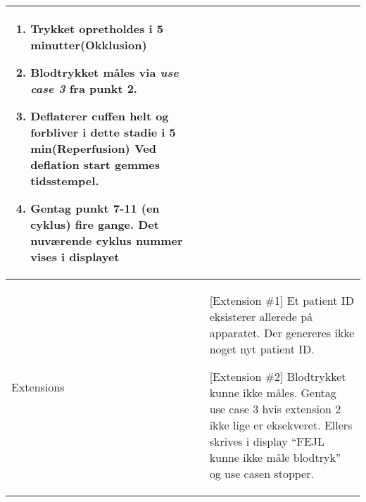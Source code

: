 \begin{center}
\begin{tabular}{ | m{4cm} | m{8cm}| }
\begin{enumerate}
				\item Trykket opretholdes i 5 minutter(Okklusion)
				\item Blodtrykket måles via \textit{use case 3}
				fra punkt 2.
				\item Deflaterer cuffen helt og forbliver i dette stadie i 5 min(Reperfusion) Ved deflation start gemmes tidsstempel.
				\item Gentag punkt 7-11 (en cyklus) fire gange. Det nuværende cyklus nummer vises i displayet
			\end{enumerate} \\ 
			\hline
			Extensions & [Extension \#1] Et patient ID eksisterer allerede på apparatet. Der genereres ikke noget nyt patient ID.
			
			[Extension \#2] Blodtrykket kunne ikke måles. Gentag use case 3 hvis extension 2 ikke lige er eksekveret. Ellers skrives i display “FEJL kunne ikke måle blodtryk” og use casen stopper.  \\
			\hline
		\end{tabular}
		
	\end{center}